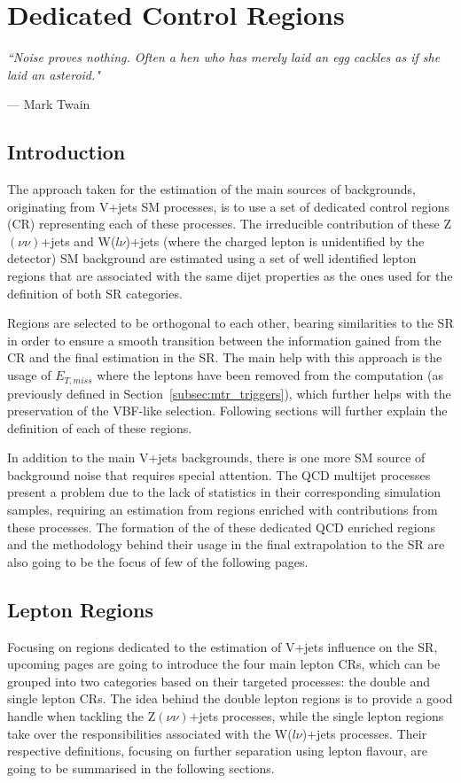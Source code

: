 \chapter{Dedicated Control Regions}
\label{ch:control_regions}
\epigraph{\itshape``Noise proves nothing. Often a hen who has merely laid an egg cackles as if she laid an asteroid."}{--- \textup{Mark Twain}}

\section{Introduction}
\hspace{10pt} The approach taken for the estimation of the main sources of backgrounds, originating from V+jets SM processes, is to use a set of dedicated control regions (CR) representing each of these processes. The irreducible contribution of these Z$(\nu\nu)$+jets and W($l\nu$)+jets (where the charged lepton is unidentified by the detector) SM background are estimated using a set of well identified lepton regions that are associated with the same dijet properties as the ones used for the definition of both SR categories.

\hspace{10pt} Regions are selected to be orthogonal to each other, bearing similarities to the SR in order to ensure a smooth transition between the information gained from the CR and the final estimation in the SR. The main help with this approach is the usage of $E_{T, miss}$ where the leptons have been removed from the computation (as previously defined in Section~\ref{subsec:mtr_triggers}), which further helps with the preservation of the VBF-like selection. Following sections will further explain the definition of each of these regions.

\hspace{10pt} In addition to the main V+jets backgrounds, there is one more SM source of background noise that requires special attention. The QCD multijet processes present a problem due to the lack of statistics in their corresponding simulation samples, requiring an estimation from regions enriched with contributions from these processes. The formation of the of these dedicated QCD enriched regions and the methodology behind their usage in the final extrapolation to the SR are also going to be the focus of few of the following pages.

\section{Lepton Regions}
\hspace{10pt} Focusing on regions dedicated to the estimation of V+jets influence on the SR, upcoming pages are going to introduce the four main lepton CRs, which can be grouped into two categories based on their targeted processes: the double and single lepton CRs. The idea behind the double lepton regions is to provide a good handle when tackling the Z$(\nu\nu)$+jets processes, while the single lepton regions take over the responsibilities associated with the W($l\nu$)+jets processes. Their respective definitions, focusing on further separation using lepton flavour, are going to be summarised in the following sections.

